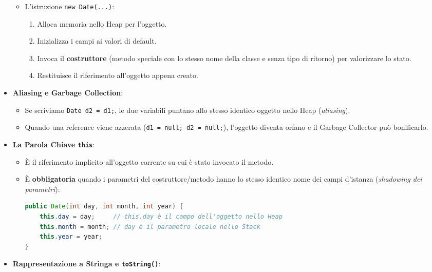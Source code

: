 \documentclass[11pt,a4paper]{article}
\newcommand{\passthrough}[1]{#1}
\providecommand{\tightlist}{\setlength{\itemsep}{0pt}\setlength{\parskip}{0pt}}
\begin{document}
\begin{itemize}
  \begin{itemize}
  \tightlist
  \item
    L'istruzione \passthrough{\lstinline!new Date(...)!}:

    \begin{enumerate}
    \def\labelenumi{\arabic{enumi}.}
    \tightlist
    \item
      Alloca memoria nello Heap per l'oggetto.
    \item
      Inizializza i campi ai valori di default.
    \item
      Invoca il \textbf{costruttore} (metodo speciale con lo stesso nome
      della classe e senza tipo di ritorno) per valorizzare lo stato.
    \item
      Restituisce il riferimento all'oggetto appena creato.
    \end{enumerate}
  \end{itemize}
\item
  \textbf{Aliasing e Garbage Collection}:

  \begin{itemize}
  \tightlist
  \item
    Se scriviamo \passthrough{\lstinline!Date d2 = d1;!}, le due
    variabili puntano allo stesso identico oggetto nello Heap
    (\emph{aliasing}).
  \item
    Quando una reference viene azzerata
    (\passthrough{\lstinline!d1 = null; d2 = null;!}), l'oggetto diventa
    orfano e il Garbage Collector può bonificarlo.
  \end{itemize}
\item
  \textbf{La Parola Chiave \passthrough{\lstinline!this!}}:

  \begin{itemize}
  \item
    È il riferimento implicito all'oggetto corrente su cui è stato
    invocato il metodo.
  \item
    È \textbf{obbligatoria} quando i parametri del costruttore/metodo
    hanno lo stesso identico nome dei campi d'istanza (\emph{shadowing
    dei parametri}):

\begin{lstlisting}[language=Java]
public Date(int day, int month, int year) {
    this.day = day;     // this.day è il campo dell'oggetto nello Heap
    this.month = month; // day è il parametro locale nello Stack
    this.year = year;
}
\end{lstlisting}
  \end{itemize}
\item
  \textbf{Rappresentazione a Stringa e
  \passthrough{\lstinline!toString()!}}:


\end{itemize}
\end{document}

